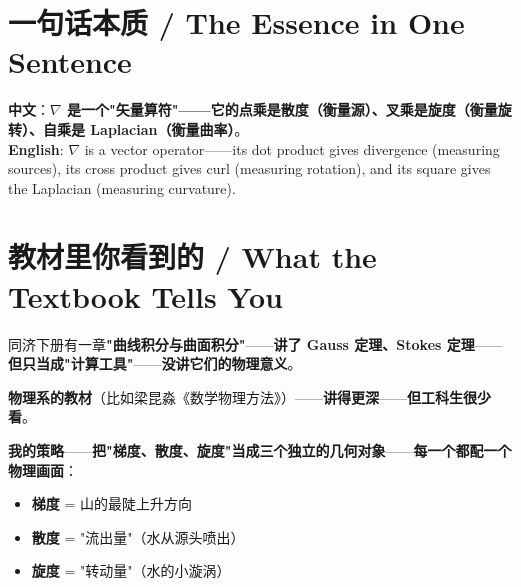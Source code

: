 \section{一句话本质 / The Essence in One Sentence}

\begin{tcolorbox}[essbox={一句话本质}]
\textbf{中文}：\textbf{$\nabla$ 是一个"矢量算符"——它的点乘是散度（衡量源）、叉乘是旋度（衡量旋转）、自乘是 Laplacian（衡量曲率）}。\\[6pt]
\textbf{English}: $\nabla$ is a vector operator——its dot product gives divergence (measuring sources), its cross product gives curl (measuring rotation), and its square gives the Laplacian (measuring curvature).
\end{tcolorbox}

\section{教材里你看到的 / What the Textbook Tells You}

同济下册有一章\textbf{"曲线积分与曲面积分"}——\textbf{讲了 Gauss 定理、Stokes 定理}——\textbf{但只当成"计算工具"}——\textbf{没讲它们的物理意义}。

\textbf{物理系的教材}（比如梁昆淼《数学物理方法》）——\textbf{讲得更深}——\textbf{但工科生很少看}。

\textbf{我的策略}——\textbf{把"梯度、散度、旋度"当成三个\textbf{独立的几何对象}}——\textbf{每一个都配一个物理画面}：

\begin{itemize}
\item \textbf{梯度} = 山的最陡上升方向
\item \textbf{散度} = "流出量"（水从源头喷出）
\item \textbf{旋度} = "转动量"（水的小漩涡）
\end{itemize}


